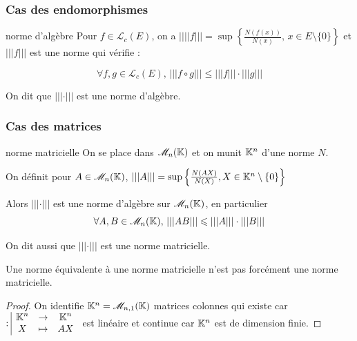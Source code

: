 \subsubsection{Cas des endomorphismes }

\begin{proposition}{norme d'algèbre}{}
    Pour $f \in \mathscr L_c(E)$, on a $||||f||| = \sup \left\{ \frac{N(f(x))}{N(x)}, \, x \in E \setminus \{0\} \right\}$
    et $|||f|||$ est une norme qui vérifie : 

    $$\forall f, g \in \mathscr L_c(E), \, |||f \circ g||| \leqslant |||f||| \cdot |||g|||$$

    On dit que $|||\cdot|||$ est une norme d'algèbre. 
\end{proposition}


\subsubsection{Cas des matrices }

\begin{proposition}{norme matricielle}{}
    On se place dans $\mathscr M_n(\mathbb{K})$ et on munit $\mathbb{K}^n$ d'une norme $N$.

    On définit pour $A \in \mathscr M_n(\mathbb{K})$, $|||A||| = \sup \left\{ \frac{N(AX)}{N(X)}, X \in \mathbb{K}^n \setminus \{0\} \right\}$
    
    Alors $|||\cdot|||$ est une norme d'algèbre sur $\mathscr M_n(\mathbb{K})$, en particulier 
    $$\forall A, B \in \mathscr M_n(\mathbb{K}), \, |||AB||| \leqslant |||A||| \cdot |||B|||$$

    On dit aussi que $|||\cdot|||$ est une norme matricielle. 
\end{proposition}

\begin{remarque}
    Une norme équivalente à une norme matricielle n'est pas forcément une norme matricielle.
\end{remarque}

\begin{proof}
    On identifie $\mathbb{K}^n = \mathscr M_{n, 1}(\mathbb{K})$ matrices colonnes qui existe 
    car $: \space \begin{array}{|ccc} \displaystyle \mathbb{K}^n & \to & \displaystyle \mathbb{K}^n \\ \displaystyle X & \mapsto & \displaystyle AX \end{array}$ est linéaire et continue car $\mathbb{K}^n$ est de dimension finie. 
    
\end{proof}



